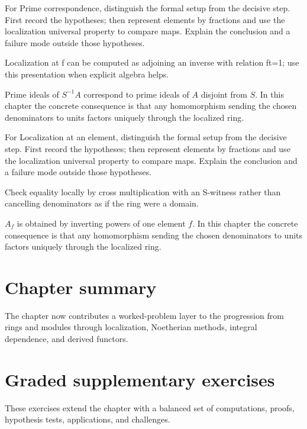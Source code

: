 \begin{exercise}\label{exr:v06-07}
For Prime correspondence, distinguish the formal setup from the decisive step. First record the hypotheses; then represent elements by fractions and use the localization universal property to compare maps. Explain the conclusion and a failure mode outside those hypotheses.
\end{exercise}
\begin{hint}
Localization at f can be computed as adjoining an inverse with relation ft=1; use this presentation when explicit algebra helps.
\end{hint}
\begin{solution}
Prime ideals of $S^{-1}A$ correspond to prime ideals of $A$ disjoint from $S$. In this chapter the concrete consequence is that any homomorphism sending the chosen denominators to units factors uniquely through the localized ring.
\end{solution}

\begin{exercise}\label{exr:v06-08}
For Localization at an element, distinguish the formal setup from the decisive step. First record the hypotheses; then represent elements by fractions and use the localization universal property to compare maps. Explain the conclusion and a failure mode outside those hypotheses.
\end{exercise}
\begin{hint}
Check equality locally by cross multiplication with an S-witness rather than cancelling denominators as if the ring were a domain.
\end{hint}
\begin{solution}
$A_f$ is obtained by inverting powers of one element $f$. In this chapter the concrete consequence is that any homomorphism sending the chosen denominators to units factors uniquely through the localized ring.
\end{solution}

\section*{Chapter summary}
The chapter now contributes a worked-problem layer to the progression from rings and modules through localization, Noetherian methods, integral dependence, and derived functors.
\section{Graded supplementary exercises}
These exercises extend the chapter with a balanced set of computations, proofs, hypothesis tests, applications, and challenges.

